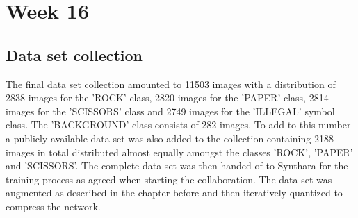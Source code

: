 \section{Week 16}
\subsection{Data set collection}
The final data set collection amounted to 11503 images with a distribution of 2838 images for the 'ROCK' class, 2820 images for the 'PAPER' class, 2814 images for the 'SCISSORS' class and 2749 images for the 'ILLEGAL' symbol class. The 'BACKGROUND' class consists of 282 images. To add to this number a publicly available data set was also added to the collection containing 2188 images in total distributed almost equally amongst the classes 'ROCK', 'PAPER' and 'SCISSORS'. The complete data set was then handed of to Synthara for the training process as agreed when starting the collaboration. The data set was augmented as described in the chapter before and then iteratively quantized to compress the network.
